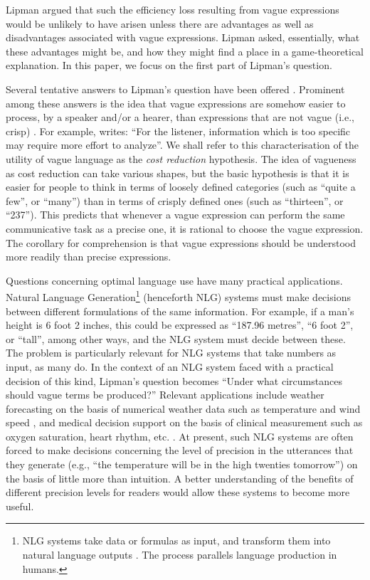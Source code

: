 \documentclass[
a4paper 
, doc
, longtable
]{apa6}
\begin{document}
Lipman argued that such the efficiency loss resulting from vague expressions would be unlikely to have arisen unless there are advantages as well as disadvantages associated with vague expressions. Lipman asked, essentially, what these advantages might be, and how they might find a place in a game-theoretical explanation. In this paper, we focus on the first part of Lipman's question.

Several tentative answers to Lipman's question have been offered  \parencite[see][]{van2009utility, van2010vagueness}. Prominent among these answers is the idea that vague expressions are somehow easier to process, by a speaker and/or a hearer, than expressions that are not vague (i.e., crisp) \cite[e.g.,][]{lipmanvague,De-Jaegher:2003lr,vanrooij2003lr}. For example, \textcite[][p.\ 11]{lipmanvague} writes: ``For the listener, information which is too specific may require more effort to analyze''. We shall refer to this characterisation of the utility of vague language as the \emph{cost reduction} hypothesis. The idea of vagueness as cost reduction can take various shapes, but the basic hypothesis is that it is easier for people to think in terms of loosely defined categories (such as ``quite a few'', or ``many'') than in terms of crisply defined ones (such as ``thirteen'', or ``237''). This predicts that whenever a vague expression can perform the same communicative task as a precise one, it is rational to choose the vague expression. The corollary for comprehension is that vague expressions should be understood more readily than precise expressions. 

Questions concerning optimal language use have many practical applications. Natural Language Generation\footnote{NLG systems take data or formulas as input, and transform them into natural language outputs \cite[][]{reiter2000building}. The process parallels language production in humans.}  (henceforth NLG) systems must make decisions between different formulations of the same information. For example, if a man's height is 6 foot 2 inches, this could be expressed as ``187.96 metres'', ``6 foot 2'', or ``tall'', among other ways, and the NLG system must decide between these.  The problem is particularly relevant for NLG systems that take numbers as input, as many do. In the context of an NLG system faced with a practical decision of this kind, Lipman's question becomes ``Under what circumstances should vague terms be produced?''  Relevant applications include weather forecasting on the basis of numerical weather data such as temperature and wind speed \cite{goldberg1994using,turner2006generating}, and medical decision support on the basis of clinical measurement such as oxygen saturation, heart rhythm, etc. \cite{Hripcsak01032009, hunter2008summarising, portet2009automatic}. At present, such NLG systems are often forced to make decisions concerning the level of precision in the utterances that they generate (e.g., ``the temperature will be in the high twenties tomorrow'') on the basis of little more than intuition. A better understanding of the benefits of different precision levels for readers would allow these systems to become more useful. 
\end{document}
